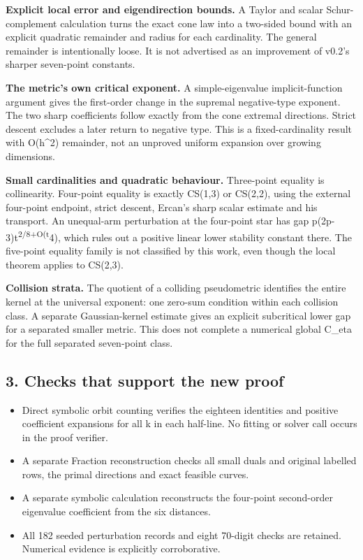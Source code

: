 \documentclass[11pt,a4paper]{article}
\newcommand{\tightlist}{\setlength{\itemsep}{0pt}\setlength{\parskip}{0pt}}
\begin{document}
\textbf{Explicit local error and eigendirection bounds.} A Taylor and
scalar Schur-complement calculation turns the exact cone law into a
two-sided bound with an explicit quadratic remainder and radius for each
cardinality. The general remainder is intentionally loose. It is not
advertised as an improvement of v0.2's sharper seven-point constants.

\textbf{The metric's own critical exponent.} A simple-eigenvalue
implicit-function argument gives the first-order change in the supremal
negative-type exponent. The two sharp coefficients follow exactly from
the cone extremal directions. Strict descent excludes a later return to
negative type. This is a fixed-cardinality result with O(h\^{}2)
remainder, not an unproved uniform expansion over growing dimensions.

\textbf{Small cardinalities and quadratic behaviour.} Three-point
equality is collinearity. Four-point equality is exactly CS(1,3) or
CS(2,2), using the external four-point endpoint, strict descent, Ercan's
sharp scalar estimate and his transport. An unequal-arm perturbation at
the four-point star has gap p(2p-3)t\textsuperscript{2/8+O(t}4), which
rules out a positive linear lower stability constant there. The
five-point equality family is not classified by this work, even though
the local theorem applies to CS(2,3).

\textbf{Collision strata.} The quotient of a colliding pseudometric
identifies the entire kernel at the universal exponent: one zero-sum
condition within each collision class. A separate Gaussian-kernel
estimate gives an explicit subcritical lower gap for a separated smaller
metric. This does not complete a numerical global C\_eta for the full
separated seven-point class.

\subsection{3. Checks that support the new
proof}\label{checks-that-support-the-new-proof}

\begin{itemize}
\tightlist
\item
  Direct symbolic orbit counting verifies the eighteen identities and
  positive coefficient expansions for all k in each half-line. No
  fitting or solver call occurs in the proof verifier.
\item
  A separate Fraction reconstruction checks all small duals and original
  labelled rows, the primal directions and exact feasible curves.
\item
  A separate symbolic calculation reconstructs the four-point
  second-order eigenvalue coefficient from the six distances.
\item
  All 182 seeded perturbation records and eight 70-digit checks are
  retained. Numerical evidence is explicitly corroborative.
\end{itemize}
\end{document}
